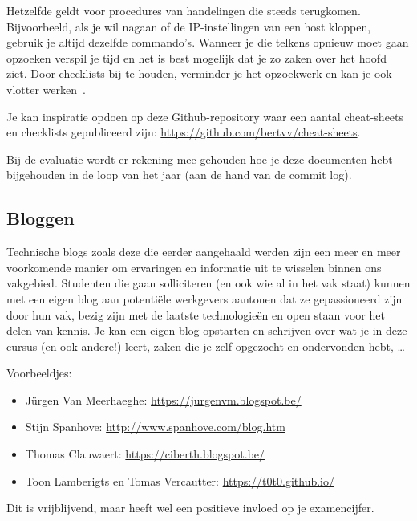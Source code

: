 Hetzelfde geldt voor procedures van handelingen die steeds terugkomen.  Bijvoorbeeld, als je wil nagaan of de IP-instellingen van een host kloppen, gebruik je altijd dezelfde commando's. Wanneer je die telkens opnieuw moet gaan opzoeken verspil je tijd en het is best mogelijk dat je zo zaken over het hoofd ziet. Door checklists bij te houden, verminder je het opzoekwerk en kan je ook vlotter werken~\autocite{Simmons2009}.

Je kan inspiratie opdoen op deze Github-repository waar een aantal cheat-sheets en checklists gepubliceerd zijn: \url{https://github.com/bertvv/cheat-sheets}.

Bij de evaluatie wordt er rekening mee gehouden hoe je deze documenten hebt bijgehouden in de loop van het jaar (aan de hand van de commit log).

\subsection{Bloggen}
\label{subs:bloggen}

Technische blogs zoals deze die eerder aangehaald werden zijn een meer en meer voorkomende manier om ervaringen en informatie uit te wisselen binnen ons vakgebied. Studenten die gaan solliciteren (en ook wie al in het vak staat) kunnen met een eigen blog aan potentiële werkgevers aantonen dat ze gepassioneerd zijn door hun vak, bezig zijn met de laatste technologieën en open staan voor het delen van kennis. Je kan een eigen blog opstarten en schrijven over wat je in deze cursus (en ook andere!) leert, zaken die je zelf opgezocht en ondervonden hebt, \ldots

Voorbeeldjes:

\begin{itemize}
\item Jürgen Van Meerhaeghe: \url{https://jurgenvm.blogspot.be/}
\item Stijn Spanhove: \url{http://www.spanhove.com/blog.htm}
\item Thomas Clauwaert: \url{https://ciberth.blogspot.be/}
\item Toon Lamberigts en Tomas Vercautter: \url{https://t0t0.github.io/}
\end{itemize}

Dit is vrijblijvend, maar heeft wel een positieve invloed op je examencijfer.

